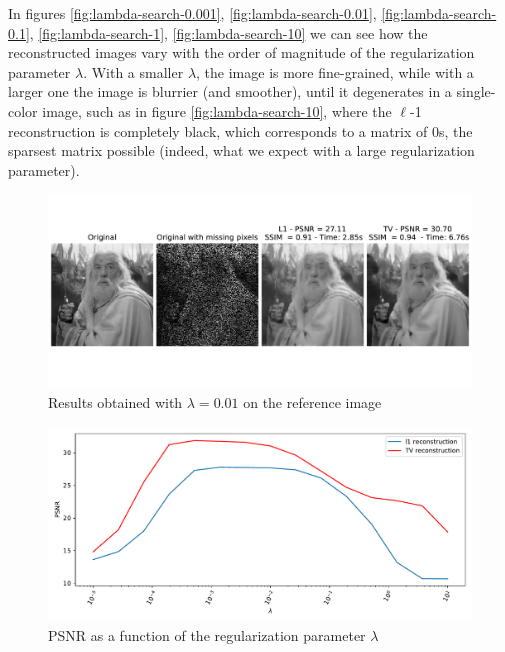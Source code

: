 \documentclass[12pt]{article}
\begin{document}
In figures \ref{fig:lambda-search-0.001}, \ref{fig:lambda-search-0.01}, \ref{fig:lambda-search-0.1}, \ref{fig:lambda-search-1}, \ref{fig:lambda-search-10} we can see how the reconstructed images vary with the order of magnitude of the regularization parameter $\lambda$. With a smaller $\lambda$, the image is more fine-grained, while with a larger one the image is blurrier (and smoother), until it degenerates in a single-color image, such as in figure \ref{fig:lambda-search-10}, where the $\ell$-1 reconstruction is completely black, which corresponds to a matrix of 0s, the sparsest matrix possible (indeed, what we expect with a large regularization parameter).

\begin{figure}[H]
    \centering
    \includegraphics[width=17cm]{hw3/codes/exercise2/results/gandalf_0-01.pdf}
    \caption{Results obtained with $\lambda = 0.01$ on the reference image}
    \label{fig:gandalf-reconstruction}
\end{figure}

\begin{figure}
    \centering
    \includegraphics[width=14cm]{hw3/codes/exercise2/results/lambda_search/lambda_search.pdf}
    \caption{PSNR as a function of the regularization parameter $\lambda$}
    \label{fig:lambda-search}
\end{figure}
\end{document}

